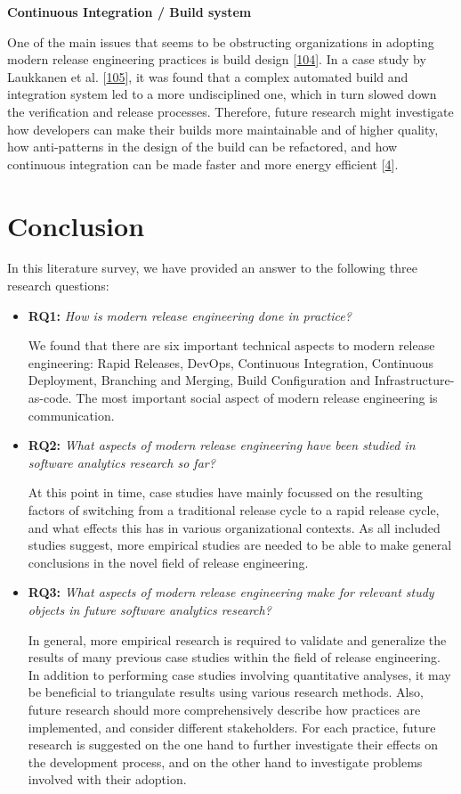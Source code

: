 \documentclass[]{book}
\begin{document}
\textbf{Continuous Integration / Build system}

One of the main issues that seems to be obstructing organizations in
adopting modern release engineering practices is build design
{[}\protect\hyperlink{ref-laukkanen2017a}{104}{]}. In a case study by
Laukkanen et al. {[}\protect\hyperlink{ref-laukkanen2018a}{105}{]}, it
was found that a complex automated build and integration system led to a
more undisciplined one, which in turn slowed down the verification and
release processes. Therefore, future research might investigate how
developers can make their builds more maintainable and of higher
quality, how anti-patterns in the design of the build can be refactored,
and how continuous integration can be made faster and more energy
efficient {[}\protect\hyperlink{ref-adams2016a}{4}{]}.

\section{Conclusion}\label{conclusion-1}

In this literature survey, we have provided an answer to the following
three research questions:

\begin{itemize}
\item
  \textbf{RQ1:} \emph{How is modern release engineering done in
  practice?}

  We found that there are six important technical aspects to modern
  release engineering: Rapid Releases, DevOps, Continuous Integration,
  Continuous Deployment, Branching and Merging, Build Configuration and
  Infrastructure-as-code. The most important social aspect of modern
  release engineering is communication.
\item
  \textbf{RQ2:} \emph{What aspects of modern release engineering have
  been studied in software analytics research so far?}

  At this point in time, case studies have mainly focussed on the
  resulting factors of switching from a traditional release cycle to a
  rapid release cycle, and what effects this has in various
  organizational contexts. As all included studies suggest, more
  empirical studies are needed to be able to make general conclusions in
  the novel field of release engineering.
\item
  \textbf{RQ3:} \emph{What aspects of modern release engineering make
  for relevant study objects in future software analytics research?}

  In general, more empirical research is required to validate and
  generalize the results of many previous case studies within the field
  of release engineering. In addition to performing case studies
  involving quantitative analyses, it may be beneficial to triangulate
  results using various research methods. Also, future research should
  more comprehensively describe how practices are implemented, and
  consider different stakeholders. For each practice, future research is
  suggested on the one hand to further investigate their effects on the
  development process, and on the other hand to investigate problems
  involved with their adoption.
\end{itemize}
\end{document}
